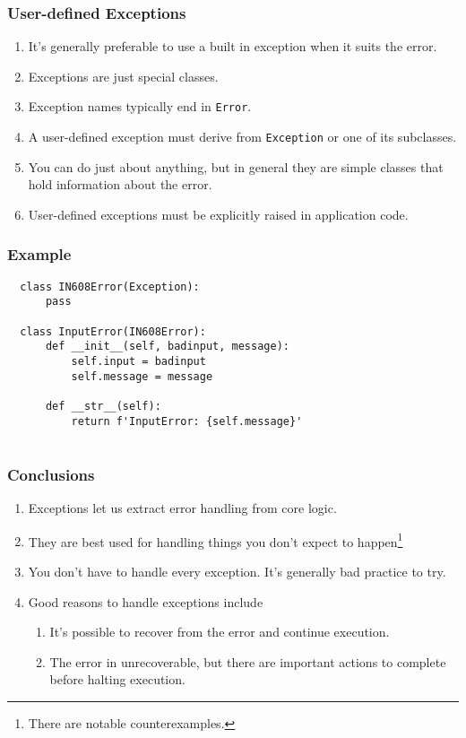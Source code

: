 \documentclass[10pt]{beamer}
\begin{document}
\begin{frame}
  \frametitle{User-defined Exceptions}
  
  \begin{enumerate}
    \item It's generally preferable to use a built in exception when it suits the error.
    \item Exceptions are just special classes.
    \item Exception names typically end in \texttt{Error}.
    \item A user-defined exception must derive from \texttt{Exception} or one of its subclasses.
    \item You can do just about anything, but in general they are simple classes that hold information about the error.
    \item User-defined exceptions must be explicitly raised in application code.
  \end{enumerate}      
\end{frame}




\begin{frame}[fragile]
  \frametitle{Example}
  
      
  \begin{verbatim}
  class IN608Error(Exception):
      pass
      
  class InputError(IN608Error):
      def __init__(self, badinput, message):
          self.input = badinput  
          self.message = message
          
      def __str__(self):
          return f'InputError: {self.message}'      
                     
  \end{verbatim}           
  
\end{frame}

\begin{frame}
  \frametitle{Conclusions}
  
  \begin{enumerate}
    \item Exceptions let us extract error handling from core logic.
    \item They are best used for handling things you don't expect to happen\footnote{There are notable counterexamples.}
    \item You don't have to handle every exception. It's generally bad practice to try. 
    \item Good reasons to handle exceptions include
      \begin{enumerate}
          \item It's possible to recover from the error and continue execution.
          \item The error in unrecoverable, but there are important actions to complete before halting execution.
      \end{enumerate}    
  \end{enumerate}      
\end{frame}
\end{document}
